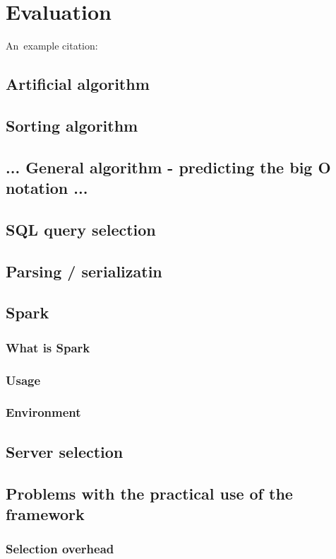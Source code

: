 \chapter{Evaluation}

An~example citation: \cite{Andel07}


\section{Artificial algorithm}
\section{Sorting algorithm}
\section{... General algorithm - predicting the big O notation ...}
\section{SQL query selection}
\section{Parsing / serializatin}
\section{Spark}
\subsection{What is Spark}
\subsection{Usage}
\subsection{Environment}
\section{Server selection}

\section{Problems with the practical use of the framework}

\subsection{Selection overhead}
